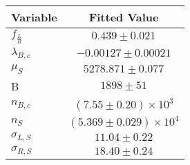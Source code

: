 \begin{tabular}[t]{lc}
\hline
Variable &Fitted Value\\
\hline\hline
$f_{\frac{L}{R}}$&$0.439\pm0.021$\\
\hline
$\lambda_{B,c}$&$-0.00127\pm0.00021$\\
\hline
$\mu_S$&$5278.871\pm0.077$\\
\hline
B&$1898\pm51$\\
\hline
$n_{B,c}$&$(7.55\pm0.20)\times 10^3$\\
\hline
$n_S$&$(5.369\pm0.029)\times 10^4$\\
\hline
$\sigma_{L, S}$&$11.04\pm0.22$\\
\hline
$\sigma_{R, S}$&$18.40\pm0.24$\\
\hline
\end{tabular}